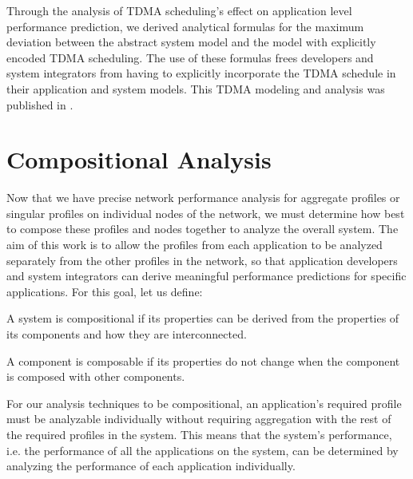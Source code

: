 Through the analysis of TDMA scheduling's effect on application level
performance prediction, we derived analytical formulas for the maximum
deviation between the abstract system model and the model with
explicitly encoded TDMA scheduling.  The use of these formulas frees
developers and system integrators from having to explicitly
incorporate the TDMA schedule in their application and system models.
This TDMA modeling and analysis was published in
\cite{ISIS_F6_ISORC_QOS:15}.

\newpage

\section{Compositional Analysis}
\label{sec:compositional_analysis}

Now that we have precise network performance analysis for aggregate
profiles or singular profiles on individual nodes of the network, we
must determine how best to compose these profiles and nodes together
to analyze the overall system.  The aim of this work is to allow the
profiles from each application to be analyzed separately from the
other profiles in the network, so that application developers and
system integrators can derive meaningful performance predictions for
specific applications.  For this goal, let us define:

\begin{definition}[Compositionality]\cite{sifakis2002}
  A system is compositional if its properties can be derived from
  the properties of its components and how they are interconnected.
\end{definition}

\begin{definition}[Composability]\cite{sifakis2002}
  A component is composable if its properties do not change
  when the component is composed with other components.
\end{definition}

For our analysis techniques to be compositional, an application's
required profile must be analyzable individually without requiring
aggregation with the rest of the required profiles in the system.
This means that the system's performance, i.e. the performance of all
the applications on the system, can be determined by analyzing the
performance of each application individually.

